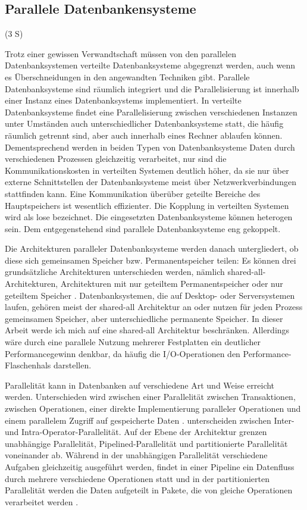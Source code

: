\documentclass[a4paper,12pt,twoside]{article}
\begin{document}
\subsection{Parallele Datenbankensysteme} (3 S)
\label{P_DBS} 

Trotz einer gewissen Verwandtschaft müssen von den parallelen Datenbanksystemen verteilte Datenbanksysteme abgegrenzt werden, auch wenn es Überschneidungen in den angewandten Techniken gibt. Parallele Datenbanksysteme sind räumlich integriert und die Parallelisierung ist innerhalb einer Instanz eines Datenbanksystems implementiert. In verteilte Datenbanksysteme findet eine Parallelisierung zwischen verschiedenen Instanzen unter Umständen auch unterschiedlicher Datenbanksysteme statt, die häufig räumlich getrennt sind, aber auch innerhalb eines Rechner ablaufen können. Dementsprechend werden in beiden Typen von Datenbanksysteme Daten durch verschiedenen Prozessen gleichzeitig verarbeitet, nur sind die Kommunikationskosten in verteilten Systemen deutlich höher, da sie nur über externe Schnittstellen der Datenbanksysteme meist über Netzwerkverbindungen stattfinden kann. Eine Kommunikation überüber geteilte Bereiche des Hauptspeichers ist wesentlich effizienter. Die Kopplung in verteilten Systemen wird als lose bezeichnet. Die eingesetzten Datenbanksysteme können heterogen sein. Dem entgegenstehend sind parallele Datenbanksysteme eng gekoppelt.

Die Architekturen paralleler Datenbanksysteme werden danach untergliedert, ob diese sich gemeinsamen Speicher bzw. Permanentspeicher teilen: Es können drei grundsätzliche Architekturen unterschieden werden, nämlich shared-all-Architekturen, Architekturen mit nur geteiltem Permanentspeicher oder nur geteiltem Speicher {\autocite{Yu1998}}. Datenbanksystemen, die auf Desktop- oder Serversystemen laufen, gehören meist der shared-all Architektur an oder nutzen für jeden Prozess gemeinsamen Speicher, aber unterschiedliche permanente Speicher. In dieser Arbeit werde ich mich auf eine shared-all Architektur beschränken. Allerdings wäre durch eine parallele Nutzung mehrerer Festplatten ein deutlicher Performancegewinn denkbar, da häufig die I/O-Operationen den Performance-Flaschenhals darstellen.

Parallelität kann in Datenbanken auf verschiedene Art und Weise erreicht werden. Unterschieden wird zwischen einer Parallelität zwischen Transaktionen, zwischen Operationen, einer direkte Implementierung paralleler Operationen und einem parallelem Zugriff auf gespeicherte Daten {\autocite{Reuter1999}}. {\textcite [S. 1]{Yu1998}} unterscheiden zwischen Inter- und Intra-Operator-Parallelität. Auf der Ebene der Architektur grenzen {\textcite{Yu1998}} unabhängige Parallelität, Pipelined-Parallelität und partitionierte Parallelität voneinander ab. Während in der unabhängigen Parallelität verschiedene Aufgaben gleichzeitig ausgeführt werden, findet in einer Pipeline ein Datenfluss durch mehrere verschiedene Operationen statt und in der partitionierten Parallelität werden die Daten aufgeteilt in Pakete, die von gleiche Operationen verarbeitet werden {\autocite{DeWitt1992}}.
\end{document}
